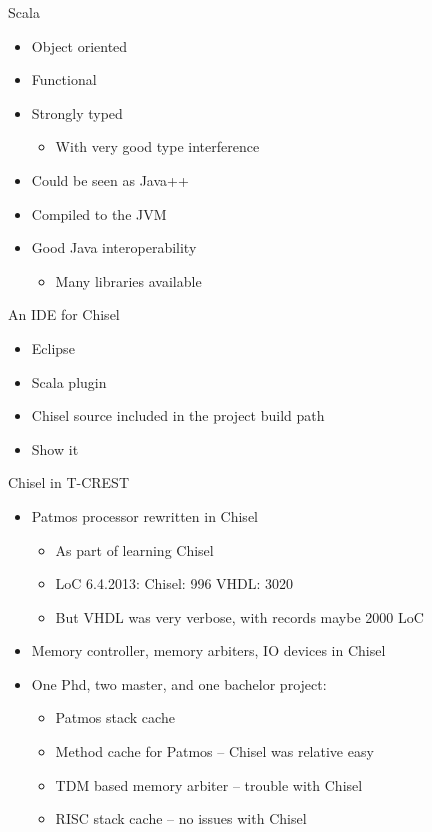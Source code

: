 \documentclass[xcolor=pdflatex,dvipsnames,table]{beamer}
\begin{document}
\begin{frame}[fragile]{Scala}
\begin{itemize}
\item Object oriented
\item Functional
\item Strongly typed
\begin{itemize}
\item With very good type interference
\end{itemize}
\item Could be seen as Java++
\item Compiled to the JVM
\item Good Java interoperability
\begin{itemize}
\item Many libraries available
\end{itemize}
\end{itemize}
\end{frame}

\begin{frame}[fragile]{An IDE for Chisel}
\begin{itemize}
\item Eclipse
\item Scala plugin
\item Chisel source included in the project build path
\item Show it
\end{itemize}
\end{frame}

\begin{frame}[fragile]{Chisel in T-CREST}
\begin{itemize}
\item Patmos processor rewritten in Chisel
\begin{itemize}
\item As part of learning Chisel
\item LoC 6.4.2013: Chisel: 996 VHDL: 3020
\item But VHDL was very verbose, with records maybe 2000 LoC
\end{itemize}
\item Memory controller, memory arbiters, IO devices in Chisel
\item One Phd, two master, and one bachelor project:
\begin{itemize}
\item Patmos stack cache
\item Method cache for Patmos -- Chisel was relative easy
\item TDM based memory arbiter -- trouble with Chisel
\item RISC stack cache -- no issues with Chisel
\end{itemize}
\end{itemize}
\end{frame}
\end{document}
